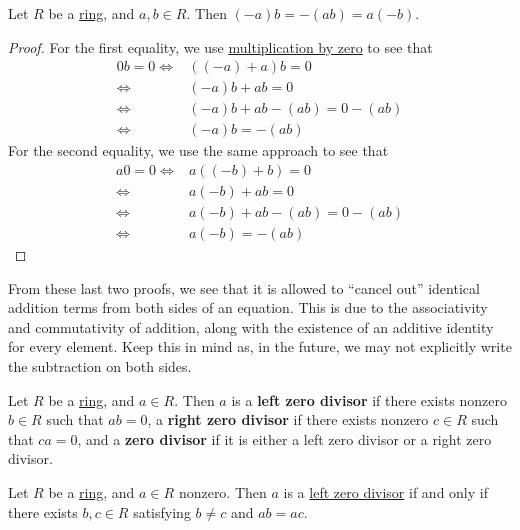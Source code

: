 \documentclass{scrartcl}
\begin{document}
\begin{proposition}
    Let $R$ be a \hyperref[def:ring]{ring}, and $a,b\in R$.
    Then $(-a)b=-(ab)=a(-b)$.
\end{proposition}

\begin{proof}
    For the first equality, we use \hyperref[prop:multiply by zero]{multiplication by zero} to see that
    \begin{align}
        0b=0
        \iff& ((-a)+a)b=0 \\
        \iff& (-a)b+ab=0 \\
        \iff& (-a)b+ab-(ab)=0-(ab) \\
        \iff& (-a)b=-(ab)
    \end{align}
    For the second equality, we use the same approach to see that
    \begin{align}
        a0=0
        \iff& a((-b)+b)=0 \\
        \iff& a(-b)+ab=0 \\
        \iff& a(-b)+ab-(ab)=0-(ab) \\
        \iff& a(-b)=-(ab)
    \end{align}
\end{proof}

\begin{remark}
    From these last two proofs, we see that it is allowed to ``cancel out'' identical addition terms from both sides of
    an equation.
    This is due to the associativity and commutativity of addition, along with the existence of an additive identity
    for every element.
    Keep this in mind as, in the future, we may not explicitly write the subtraction on both sides.
\end{remark}

\begin{definition}
    \label{def:zero divisor}
    Let $R$ be a \hyperref[def:ring]{ring}, and $a\in R$.
    Then $a$ is a \textbf{left zero divisor} if there exists nonzero $b\in R$ such that $ab=0$, a
    \textbf{right zero divisor} if there exists nonzero $c\in R$ such that $ca=0$, and a \textbf{zero divisor} if it is
    either a left zero divisor or a right zero divisor.
\end{definition}

\begin{proposition}
    Let $R$ be a \hyperref[def:ring]{ring}, and $a\in R$ nonzero.
    Then $a$ is a \hyperref[def:zero divisor]{left zero divisor} if and only if there exists $b,c\in R$ satisfying
    $b\neq c$ and $ab=ac$.
\end{proposition}
\end{document}
